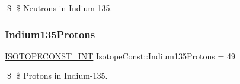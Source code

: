 \$ \$ Neutrons in Indium-\/135. \mbox{\label{group___isotope_const-_indium-_in135_gaa0c575680650d7f77d363291954254fb}} 
\subsubsection{\texorpdfstring{Indium135\+Protons}{Indium135Protons}}
{\footnotesize\ttfamily \mbox{\hyperlink{group___isotope_const-_macros_ga5f18360b3e99483a35c32d789e62621c}{I\+S\+O\+T\+O\+P\+E\+C\+O\+N\+S\+T\+\_\+\+I\+NT}} Isotope\+Const\+::\+Indium135\+Protons = 49}

\$ \$ Protons in Indium-\/135. 